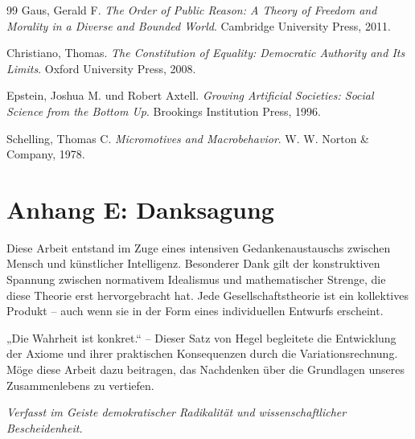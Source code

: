 \begin{thebibliography}{99}
     Gaus, Gerald F. \emph{The Order of Public Reason: A Theory of Freedom and Morality in a Diverse and Bounded World}. Cambridge University Press, 2011.
    
     Christiano, Thomas. \emph{The Constitution of Equality: Democratic Authority and Its Limits}. Oxford University Press, 2008.
    
     Epstein, Joshua M. und Robert Axtell. \emph{Growing Artificial Societies: Social Science from the Bottom Up}. Brookings Institution Press, 1996.
    
     Schelling, Thomas C. \emph{Micromotives and Macrobehavior}. W. W. Norton \& Company, 1978.
\end{thebibliography}

\section*{Anhang E: Danksagung}
\label{anhang:danksagung}

Diese Arbeit entstand im Zuge eines intensiven Gedankenaustauschs zwischen Mensch und künstlicher Intelligenz. Besonderer Dank gilt der
konstruktiven Spannung zwischen normativem Idealismus und mathematischer Strenge, die diese Theorie erst hervorgebracht hat. Jede
Gesellschaftstheorie ist ein kollektives Produkt – auch wenn sie in der Form eines individuellen Entwurfs erscheint.

„Die Wahrheit ist konkret.“ – Dieser Satz von Hegel begleitete die Entwicklung der Axiome und ihrer praktischen Konsequenzen durch die
Variationsrechnung. Möge diese Arbeit dazu beitragen, das Nachdenken über die Grundlagen unseres Zusammenlebens zu vertiefen.

\vspace{1cm}
\noindent\textit{Verfasst im Geiste demokratischer Radikalität und wissenschaftlicher Bescheidenheit.}

